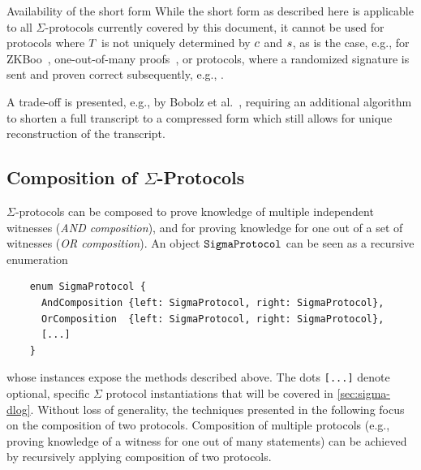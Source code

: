 \documentclass[11pt]{article}
\begin{document}
\begin{remark}{Availability of the short form}{}
  While the short form as described here is applicable to all $\Sigma$-protocols currently covered by this document, it cannot be used for protocols where $T$ is not uniquely determined by $c$ and $s$, as is the case, e.g., for ZKBoo~\cite{USENIX:GiaMadOrl16}, one-out-of-many proofs~\cite{EC:GroKoh15}, or protocols, where a randomized signature is sent and proven correct subsequently, e.g., \cite{RSA:PoiSan16,AC:CamChaShe08}.

  A trade-off is presented, e.g., by Bobolz et al.~\cite{EPRINT:BEHF21}, requiring an additional algorithm to shorten a full transcript to a compressed form which still allows for unique reconstruction of the transcript.
\end{remark}







\subsection{Composition of $\Sigma$-Protocols}
\label{sec:composition}
\label{sec:or-comp}
\label{sec:and-comp}
  $\Sigma$-protocols can be composed to prove knowledge of multiple independent witnesses (\emph{AND composition}), and for proving knowledge for one out of a set of witnesses (\emph{OR composition}). An object $\texttt{SigmaProtocol}$ can be seen as a recursive enumeration

  \begin{verbatim}
    enum SigmaProtocol {
      AndComposition {left: SigmaProtocol, right: SigmaProtocol},
      OrComposition  {left: SigmaProtocol, right: SigmaProtocol},
      [...]
    }
  \end{verbatim}
whose instances expose the methods described above.
The dots \texttt{[...]} denote optional, specific $\Sigma$ protocol instantiations that will be covered in \cref{sec:sigma-dlog}.
  Without loss of generality, the techniques presented in the following focus on the composition of two protocols.
  Composition of multiple protocols (e.g., proving knowledge of a witness for one out of many statements) can be achieved by recursively applying composition of two protocols.
\end{document}
